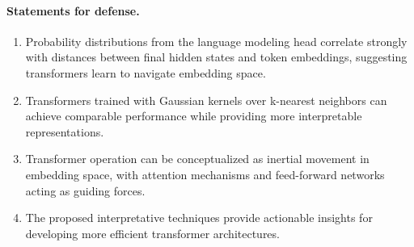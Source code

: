 \paragraph{Statements for defense.}
\begin{enumerate}
    \item Probability distributions from the language modeling head correlate strongly with distances between final hidden states and token embeddings, suggesting transformers learn to navigate embedding space.
    
    \item Transformers trained with Gaussian kernels over k-nearest neighbors can achieve comparable performance while providing more interpretable representations.
    
    \item Transformer operation can be conceptualized as inertial movement in embedding space, with attention mechanisms and feed-forward networks acting as guiding forces.
    
    \item The proposed interpretative techniques provide actionable insights for developing more efficient transformer architectures.
\end{enumerate}
